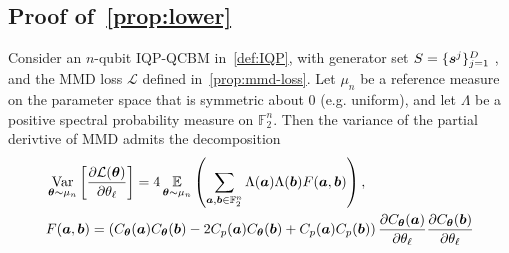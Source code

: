 \documentclass{article}
\theoremstyle{plain}
\theoremstyle{definition}
\theoremstyle{remark}
\begin{document}
\subsection{Proof of~\cref{prop:lower}}
Consider an $n$-qubit IQP-QCBM in~\cref{def:IQP}, with generator set $S=\{{\bm{s}^j}\}_{j=1}^D$ , and the MMD loss $\mathcal{L}$ defined in~\cref{prop:mmd-loss}. Let $\mu_n$ be a reference measure on the parameter space that is symmetric about 0 (e.g. uniform), and let $\Lambda$ be a positive spectral probability measure on $\mathbb{F}_2^n$. Then the variance of the partial derivtive of MMD admits the decomposition
\begin{align*}
&\operatorname*{Var}_{{\bm{\theta}}\sim \mu_n} \left[ \frac{\partial \mathcal{L}({\bm{\theta}})}{\partial \theta_\ell} \right]
= 4 \operatorname*{\mathbb{E}}_{{\bm{\theta}}\sim \mu_n} \left( \sum_{{\bm{a}}, {\bm{b}} \in \mathbb{F}_2^n} \Lambda({\bm{a}}) \Lambda({\bm{b}})F({\bm{a}}, {\bm{b}})\right), \label{eq: decomposition} \\
&F({\bm{a}}, {\bm{b}}) = \left( C_{\bm{\theta}}({\bm{a}}) C_{\bm{\theta}}({\bm{b}}) - 2C_p({\bm{a}}) C_{\bm{\theta}}({\bm{b}}) + C_p({\bm{a}}) C_p({\bm{b}}) \right)\frac{\partial C_{\bm{\theta}}({\bm{a}})}{\partial \theta_\ell} \frac{\partial C_{\bm{\theta}}({\bm{b}})}{\partial \theta_\ell} \nonumber
\end{align*}
\end{document}
